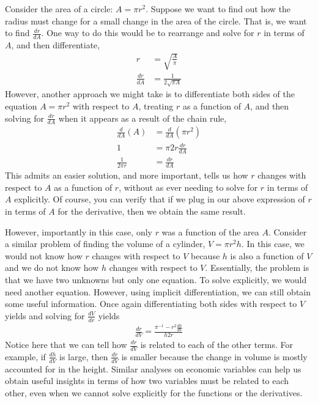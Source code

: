 Consider the area of a circle: $A = \pi r^2$. Suppose we want to find out how the radius must change for a small change in the area of the circle. That is, we want to find $\frac{dr}{dA}$. One way to do this would be to rearrange and solve for $r$ in terms of $A$, and then differentiate,
\begin{align*}
    r &= \sqrt{\frac{A}{\pi}} \\
    \frac{dr}{dA} &= \frac{1}{2\sqrt{\pi A}}
\end{align*}
However, another approach we might take is to differentiate both sides of the equation $A = \pi r^2$ with respect to $A$, treating $r$ as a function of $A$, and then solving for $\frac{dr}{dA}$ when it appears as a result of the chain rule,
\begin{align*}
    \frac{d}{dA} (A) &= \frac{d}{dA} (\pi r^2) \\
    1 &= \pi 2r \frac{dr}{dA} \\
    \frac{1}{2\pi r} &= \frac{dr}{dA}
\end{align*}
This admits an easier solution, and more important, tells us how $r$ changes with respect to $A$ as a function of $r$, without as ever needing to solve for $r$ in terms of $A$ explicitly. Of course, you can verify that if we plug in our above expression of $r$ in terms of $A$ for the derivative, then we obtain the same result. 

However, importantly in this case, only $r$ was a function of the area $A$. Consider a similar problem of finding the volume of a cylinder, $V = \pi r^2 h$. In this case, we would not know how $r$ changes with respect to $V$ because $h$ is also a function of $V$ and we do not know how $h$ changes with respect to $V$. Essentially, the problem is that we have two unknowns but only one equation. To solve explicitly, we would need another equation. However, using implicit differentiation, we can still obtain some useful information. Once again differentiating both sides with respect to $V$ yields and solving for $\frac{dV}{dr}$ yields
\begin{align*}
    \frac{dr}{dV} = \frac{\pi^{-1} - r^2 \frac{dh}{dV}}{h2r}
\end{align*}
Notice here that we can tell how $\frac{dr}{dV}$ is related to each of the other terms. For example, if $\frac{dh}{dV}$ is large, then $\frac{dr}{dV}$ is smaller because the change in volume is mostly accounted for in the height. Similar analyses on economic variables can help us obtain useful insights in terms of how two variables must be related to each other, even when we cannot solve explicitly for the functions or the derivatives. 

